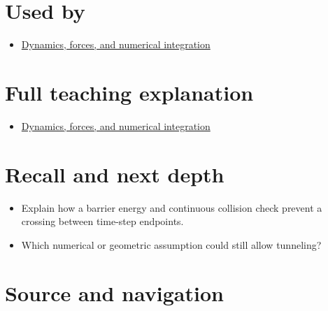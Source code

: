 \section{Used by}\label{appendix-a9ba01fa72a6-used-by}

\begin{itemize}
\tightlist
\item
  \href{Continuous\%20Notes/University\%20-\%20Worlds,\%20Images\%20and\%20Inference\%20-\%20Graphics,\%20Vision\%20and\%20Photography\#Dynamics,\%20forces,\%20and\%20numerical\%20integration}{Dynamics, forces, and numerical integration}
\end{itemize}

\section{Full teaching explanation}\label{appendix-a9ba01fa72a6-full-teaching-explanation}

\begin{itemize}
\tightlist
\item
  \href{Continuous\%20Notes/University\%20-\%20Worlds,\%20Images\%20and\%20Inference\%20-\%20Graphics,\%20Vision\%20and\%20Photography\#Dynamics,\%20forces,\%20and\%20numerical\%20integration}{Dynamics, forces, and numerical integration}
\end{itemize}

\section{Recall and next depth}\label{appendix-a9ba01fa72a6-recall-and-next-depth}

\begin{itemize}
\tightlist
\item
  Explain how a barrier energy and continuous collision check prevent a crossing between time-step endpoints.
\item
  Which numerical or geometric assumption could still allow tunneling?
\end{itemize}

\section{Source and navigation}\label{appendix-a9ba01fa72a6-source-and-navigation}

